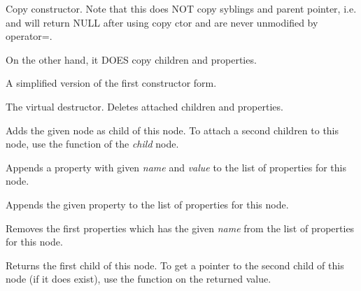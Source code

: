 
Copy constructor. Note that this does NOT copy syblings
and parent pointer, i.e.  and  will return NULL
after using copy ctor and are never unmodified by operator=.

On the other hand, it DOES copy children and properties.



A simplified version of the first constructor form.


\label{wxxmlnodedtor}


The virtual destructor. Deletes attached children and properties.

\label{wxxmlnodeaddchild}


Adds the given node as child of this node. To attach a second children to this node, use the
 function of the {\it child} node.

\label{wxxmlnodeaddproperty}


Appends a property with given {\it name} and {\it value} to the list of properties for this node.


Appends the given property to the list of properties for this node.

\label{wxxmlnodedeleteproperty}


Removes the first properties which has the given {\it name} from the list of properties for this node.

\label{wxxmlnodegetchildren}


Returns the first child of this node.
To get a pointer to the second child of this node (if it does exist), use the
 function on the returned value.

